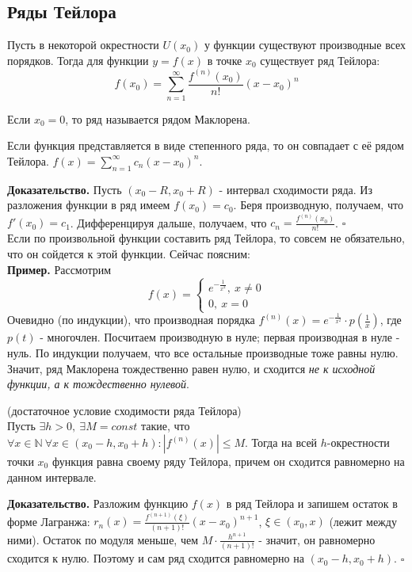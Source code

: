 \subsection{Ряды Тейлора}
\begin{defin}
Пусть в некоторой окрестности $U(x_0)$ у функции существуют производные всех 
порядков. Тогда для функции $y=f(x)$ в точке $x_0$ существует ряд Тейлора:
$$f(x_0)=\sum\limits_{n=1}^{\infty} \frac{f^{(n)}(x_0)}{n!}(x-x_0)^n$$
\end{defin}
Если $x_0=0$, то ряд называется рядом Маклорена.
\begin{theor}
Если функция представляется в виде степенного ряда, то он совпадает с 
её рядом Тейлора. $f(x)=\sum\limits_{n=1}^{\infty} c_n(x-x_0)^n$.
\end{theor}
\textbf{Доказательство.}  Пусть $(x_0-R,x_0+R)$ - интервал сходимости ряда. 
Из разложения функции в ряд имеем  $f(x_0)=c_0$. Беря производную, получаем,
что  $f'(x_0)=c_1$. Дифференцируя дальше, получаем, что  $c_n=
\frac{f^{(n)}(x_0)}{n!}$. $\square$ \\
Если по произвольной функции составить ряд Тейлора, то совсем не обязательно,
что он сойдется к этой функции. Сейчас поясним:\\
\textbf{Пример.} Рассмотрим
$$f(x)=\begin{cases}
    e^{-\frac{1}{x^2}},~x\ne0\\0,~x=0    
\end{cases}$$
Очевидно (по индукции), что производная порядка $f^{(n)}(x)=e^{-\frac{1}{x^2}}
\cdot p\left( \frac{1}{x} \right)$, где $p(t)$ - многочлен. Посчитаем
производную в нуле; первая производная в нуле - нуль. По индукции получаем,
что все остальные производные тоже равны нулю. Значит, ряд Маклорена 
тождественно равен нулю, и сходится \textit{не к исходной функции, а
к тождественно нулевой}.
 \begin{theor}
     (достаточное условие сходимости ряда Тейлора)\\
Пусть $\exists h>0,~\exists M=const$ такие, что $\forall x\in \mathbb{N}~
\forall x\in(x_0-h,x_0+h): |f^{(n)}(x)|\leqslant M$. Тогда на всей
$h$-окрестности точки $x_0$ функция равна своему ряду Тейлора, 
причем он сходится равномерно на данном интервале. 
\end{theor}
\textbf{Доказательство.}  Разложим функцию $f(x)$ в ряд Тейлора и запишем  
остаток в форме Лагранжа: $r_n(x)=\frac{f^{(n+1)}(\xi)}{(n+1)!}(x-x_0)^{n+1}$,
$\xi\in(x_0,x)$ (лежит между ними).  Остаток по модуля меньше, чем
$M\cdot \frac{h^{n+1}}{(n+1)!}$ - значит, он равномерно сходится к нулю. 
Поэтому и сам ряд сходится равномерно на $(x_0-h,x_0+h)$. $\square$ 

